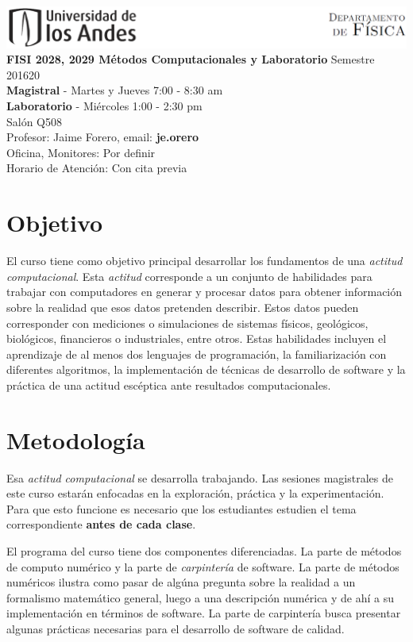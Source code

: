 \documentclass[11pt]{article}
\begin{document}
\includegraphics[width=490pt]{header.png}\\[0.5cm]

\noindent
\textbf{FISI 2028, 2029 Métodos Computacionales y Laboratorio} Semestre 201620\\
\textbf{Magistral} - Martes y Jueves 7:00 - 8:30 am \\
\textbf{Laboratorio} - Mi\'ercoles 1:00 - 2:30 pm \\
Salón Q508\\
Profesor: Jaime Forero, email: \textbf{je.orero}\\
Oficina, Monitores: Por definir\\
Horario de Atención: Con cita previa


\section*{Objetivo}
El curso tiene como objetivo principal desarrollar los fundamentos 
de una \emph{actitud computacional}.  
Esta \emph{actitud } corresponde a un conjunto de habilidades para
trabajar con computadores en generar y procesar datos para obtener
informaci\'on sobre la realidad que esos datos pretenden
describir. 
Estos datos pueden corresponder con mediciones o simulaciones de
sistemas f\'isicos, geol\'ogicos, biol\'ogicos, financieros o
industriales, entre otros.     
Estas habilidades incluyen el aprendizaje de al menos dos lenguajes de
programaci\'on, la familiarizaci\'on con diferentes algoritmos, la
implementaci\'on de t\'ecnicas de desarrollo de software y la
pr\'actica de una actitud esc\'eptica ante resultados
computacionales.

\section*{Metodolog\'ia}
Esa \emph{actitud computacional} se desarrolla trabajando. 
Las sesiones magistrales de este curso estar\'an enfocadas
en la exploraci\'on, pr\'actica y la experimentaci\'on. 
Para que esto  funcione es necesario que los estudiantes estudien el
tema correspondiente {\bf antes de cada clase}.  

El programa del curso tiene dos componentes diferenciadas. La parte de
m\'etodos de computo num\'erico y la parte de
\emph{carpinter\'ia} de software. 
La parte de m\'etodos num\'ericos ilustra como pasar de alg\'una
pregunta sobre la realidad a un formalismo
matem\'atico general, luego a una descripci\'on num\'erica y de ah\'i
a su implementaci\'on en t\'erminos de software.
La parte de carpinter\'ia busca presentar algunas pr\'acticas
necesarias para el desarrollo de software de calidad.
\end{document}
